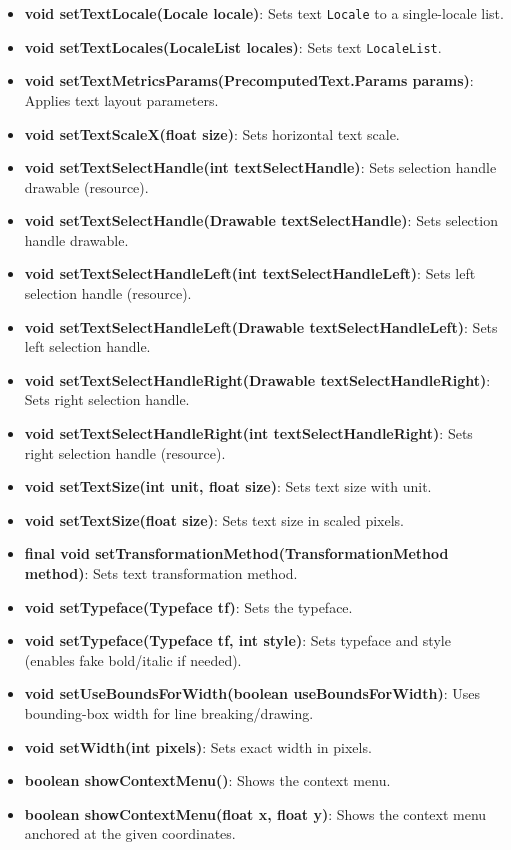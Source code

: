\documentclass{report}
\begin{document}
\begin{itemize}
\begin{itemize}
                \item \textbf{void setTextLocale(Locale locale)}: Sets text \texttt{Locale} to a single-locale list.
                \item \textbf{void setTextLocales(LocaleList locales)}: Sets text \texttt{LocaleList}.
                \item \textbf{void setTextMetricsParams(PrecomputedText.Params params)}: Applies text layout parameters.
                \item \textbf{void setTextScaleX(float size)}: Sets horizontal text scale.
                \item \textbf{void setTextSelectHandle(int textSelectHandle)}: Sets selection handle drawable (resource).
                \item \textbf{void setTextSelectHandle(Drawable textSelectHandle)}: Sets selection handle drawable.
                \item \textbf{void setTextSelectHandleLeft(int textSelectHandleLeft)}: Sets left selection handle (resource).
                \item \textbf{void setTextSelectHandleLeft(Drawable textSelectHandleLeft)}: Sets left selection handle.
                \item \textbf{void setTextSelectHandleRight(Drawable textSelectHandleRight)}: Sets right selection handle.
                \item \textbf{void setTextSelectHandleRight(int textSelectHandleRight)}: Sets right selection handle (resource).
                \item \textbf{void setTextSize(int unit, float size)}: Sets text size with unit.
                \item \textbf{void setTextSize(float size)}: Sets text size in scaled pixels.
                \item \textbf{final void setTransformationMethod(TransformationMethod method)}: Sets text transformation method.
                \item \textbf{void setTypeface(Typeface tf)}: Sets the typeface.
                \item \textbf{void setTypeface(Typeface tf, int style)}: Sets typeface and style (enables fake bold/italic if needed).
                \item \textbf{void setUseBoundsForWidth(boolean useBoundsForWidth)}: Uses bounding-box width for line breaking/drawing.
                \item \textbf{void setWidth(int pixels)}: Sets exact width in pixels.
                \item \textbf{boolean showContextMenu()}: Shows the context menu.
                \item \textbf{boolean showContextMenu(float x, float y)}: Shows the context menu anchored at the given coordinates.
            \end{itemize}


\end{itemize}
\end{document}
